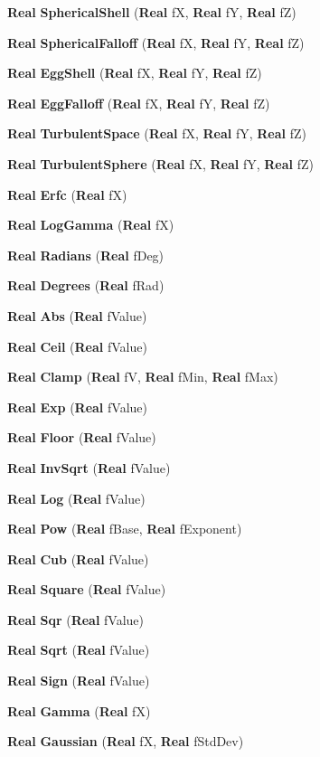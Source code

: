 \begin{CompactItemize}
{\bf Real} {\bf Spherical\-Shell} ({\bf Real} f\-X, {\bf Real} f\-Y, {\bf Real} f\-Z)
\item 
{\bf Real} {\bf Spherical\-Falloff} ({\bf Real} f\-X, {\bf Real} f\-Y, {\bf Real} f\-Z)
\item 
{\bf Real} {\bf Egg\-Shell} ({\bf Real} f\-X, {\bf Real} f\-Y, {\bf Real} f\-Z)
\item 
{\bf Real} {\bf Egg\-Falloff} ({\bf Real} f\-X, {\bf Real} f\-Y, {\bf Real} f\-Z)
\item 
{\bf Real} {\bf Turbulent\-Space} ({\bf Real} f\-X, {\bf Real} f\-Y, {\bf Real} f\-Z)
\item 
{\bf Real} {\bf Turbulent\-Sphere} ({\bf Real} f\-X, {\bf Real} f\-Y, {\bf Real} f\-Z)
\item 
{\bf Real} {\bf Erfc} ({\bf Real} f\-X)
\item 
{\bf Real} {\bf Log\-Gamma} ({\bf Real} f\-X)
\item 
{\bf Real} {\bf Radians} ({\bf Real} f\-Deg)
\item 
{\bf Real} {\bf Degrees} ({\bf Real} f\-Rad)
\item 
{\bf Real} {\bf Abs} ({\bf Real} f\-Value)
\item 
{\bf Real} {\bf Ceil} ({\bf Real} f\-Value)
\item 
{\bf Real} {\bf Clamp} ({\bf Real} f\-V, {\bf Real} f\-Min, {\bf Real} f\-Max)
\item 
{\bf Real} {\bf Exp} ({\bf Real} f\-Value)
\item 
{\bf Real} {\bf Floor} ({\bf Real} f\-Value)
\item 
{\bf Real} {\bf Inv\-Sqrt} ({\bf Real} f\-Value)
\item 
{\bf Real} {\bf Log} ({\bf Real} f\-Value)
\item 
{\bf Real} {\bf Pow} ({\bf Real} f\-Base, {\bf Real} f\-Exponent)
\item 
{\bf Real} {\bf Cub} ({\bf Real} f\-Value)
\item 
{\bf Real} {\bf Square} ({\bf Real} f\-Value)
\item 
{\bf Real} {\bf Sqr} ({\bf Real} f\-Value)
\item 
{\bf Real} {\bf Sqrt} ({\bf Real} f\-Value)
\item 
{\bf Real} {\bf Sign} ({\bf Real} f\-Value)
\item 
{\bf Real} {\bf Gamma} ({\bf Real} f\-X)
\item 
{\bf Real} {\bf Gaussian} ({\bf Real} f\-X, {\bf Real} f\-Std\-Dev)
\item 

\end{CompactItemize}
